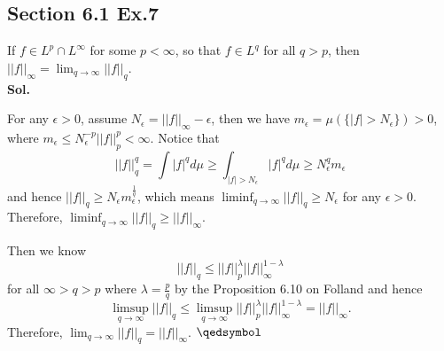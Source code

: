 \documentclass[lang=en,11pt,a4paper,citestyle =authoryear]{elegantpaper}
\newcommand{\prvd}{$\hfill \qedsymbol$}
\begin{document}
\subsection*{Section 6.1 Ex.7} 
If $f\in L^p\cap L^{\infty}$ for some $p<\infty$, so that $f\in L^q$ for all $q>p$, then $||f||_{\infty} = \lim_{q\to\infty} ||f||_q$.
\vspace{0.5em}\\
\textbf{Sol.} \par
For any $\epsilon > 0$, assume $N_{\epsilon} = ||f||_{\infty} - \epsilon$, then we have $m_{\epsilon} = \mu(\{|f|>N_{\epsilon}\}) > 0$, where $m_{\epsilon} \leq N_{\epsilon}^{-p}||f||_p^p < \infty$. Notice that
\[||f||_q^q = \int |f|^q d\mu \geq \int_{|f|>N_{\epsilon}} |f|^q d\mu \geq N_{\epsilon}^q m_{\epsilon}\]
and hence $||f||_q \geq N_{\epsilon} m_{\epsilon}^{\tfrac{1}{q}}$, which means $\liminf_{q\to\infty} ||f||_q \geq N_{\epsilon}$ for any $\epsilon > 0$. Therefore, $\liminf_{q\to\infty}||f||_q \geq ||f||_{\infty}$.\par
Then we know
\[||f||_q \leq ||f||_p^{\lambda}||f||_{\infty}^{1-\lambda}\]
for all $\infty>q>p$ where $\lambda = \tfrac{p}{q}$ by the Proposition 6.10 on Folland and hence
\[\limsup_{q\to\infty} ||f||_q \leq \limsup_{q\to\infty}||f||_p^{\lambda}||f||_{\infty}^{1-\lambda} = ||f||_{\infty}.\]
Therefore, $\lim_{q\to\infty} ||f||_q = ||f||_{\infty}$.
\prvd
\vspace{0.5em}
\end{document}
